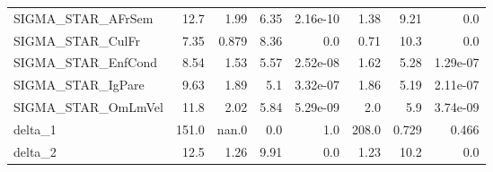 \begin{tabular}{lrrrrrrr}
SIGMA\_STAR\_AFrSem  &   12.7 &     1.99 &    6.35 & 2.16e-10 &          1.38 &         9.21 &           0.0 \\
SIGMA\_STAR\_CulFr   &   7.35 &    0.879 &    8.36 &      0.0 &          0.71 &         10.3 &           0.0 \\
SIGMA\_STAR\_EnfCond &   8.54 &     1.53 &    5.57 & 2.52e-08 &          1.62 &         5.28 &      1.29e-07 \\
SIGMA\_STAR\_IgPare  &   9.63 &     1.89 &     5.1 & 3.32e-07 &          1.86 &         5.19 &      2.11e-07 \\
SIGMA\_STAR\_OmLmVel &   11.8 &     2.02 &    5.84 & 5.29e-09 &           2.0 &          5.9 &      3.74e-09 \\
delta\_1            &  151.0 &    nan.0 &     0.0 &      1.0 &         208.0 &        0.729 &         0.466 \\
delta\_2            &   12.5 &     1.26 &    9.91 &      0.0 &          1.23 &         10.2 &           0.0 \\
\bottomrule
\end{tabular}

